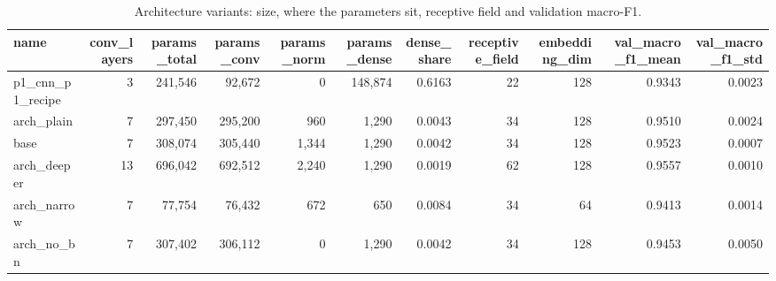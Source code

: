 \begin{table}[t]
\centering
\caption{Architecture variants: size, where the parameters sit, receptive field and validation macro-F1.}
\label{tab:p2_architectures}
\footnotesize
\begin{tabular}{lrrrrrrrrrr}
\toprule
name & conv\_layers & params\_total & params\_conv & params\_norm & params\_dense & dense\_share & receptive\_field & embedding\_dim & val\_macro\_f1\_mean & val\_macro\_f1\_std \\
\midrule
p1\_cnn\_p1\_recipe & 3 & 241,546 & 92,672 & 0 & 148,874 & 0.6163 & 22 & 128 & 0.9343 & 0.0023 \\
arch\_plain & 7 & 297,450 & 295,200 & 960 & 1,290 & 0.0043 & 34 & 128 & 0.9510 & 0.0024 \\
base & 7 & 308,074 & 305,440 & 1,344 & 1,290 & 0.0042 & 34 & 128 & 0.9523 & 0.0007 \\
arch\_deeper & 13 & 696,042 & 692,512 & 2,240 & 1,290 & 0.0019 & 62 & 128 & 0.9557 & 0.0010 \\
arch\_narrow & 7 & 77,754 & 76,432 & 672 & 650 & 0.0084 & 34 & 64 & 0.9413 & 0.0014 \\
arch\_no\_bn & 7 & 307,402 & 306,112 & 0 & 1,290 & 0.0042 & 34 & 128 & 0.9453 & 0.0050 \\
\bottomrule
\end{tabular}
\end{table}

